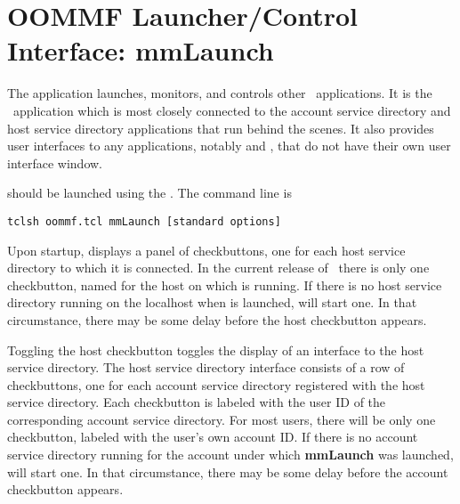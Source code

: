 \section{OOMMF Launcher/Control Interface: mmLaunch}\label{sec:mmlaunch}

\begin{center}
\end{center}

The application  launches, monitors, and controls other 
\OOMMF\ applications.  It is the \OOMMF\ application which is
most closely connected to the account service directory and host
service directory applications that run behind the scenes.  It also
provides user interfaces
to any applications, notably
 and
, that do not have their own user interface
window.

 should be launched using the .  The command
line is
\begin{verbatim}
tclsh oommf.tcl mmLaunch [standard options]
\end{verbatim}

Upon startup,  displays a panel of checkbuttons, one for
each host service directory
to which it is connected.  In the current
release of \OOMMF\ there is only one checkbutton, named for the host on
which  is running.
If there is no host service directory running on the
localhost when  is launched,
 will start one.  In that circumstance, there may be 
some delay before the host checkbutton appears.

Toggling the host checkbutton toggles the display of an
interface to the host service directory.  The host service directory
interface consists of a row of checkbuttons, one for each account
service directory
registered with the host service directory.  Each
checkbutton is labeled with the user ID
of the corresponding account
service directory.  For most users, there will be only one
checkbutton, labeled with the user's own account
ID.
If there is no account service directory running for the
account under which {\bf mmLaunch} was launched,  will
start one.  In that circumstance, there may be some delay before the
account checkbutton appears.

